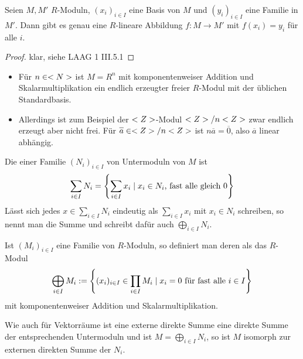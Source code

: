 \begin{proposition}
	Seien $M,M'$ $R$-Moduln, $(x_i)_{i\in I}$ eine Basis von $M$ und $(y_i)_{i\in I}$ eine Familie in $M'$. Dann gibt es genau eine $R$-lineare Abbildung $f:M\to M'$ mit $f(x_i)=y_i$ für alle $i$.
\end{proposition}
\begin{proof}
	klar, siehe LAAG 1 III.5.1 %
\end{proof}

\begin{example}
	\begin{itemize}
		\item Für $n\in<N>$ ist $M=R^n$ mit komponentenweiser Addition und Skalarmultiplikation ein endlich erzeugter freier $R$-Modul mit der üblichen Standardbasis.
		\item Allerdings ist zum Beispiel der $<Z>$-Modul $<Z>/n<Z>$ zwar endlich erzeugt aber nicht frei. Für $\overline{a}\in\whole/n\whole$ ist $n\overline{a}=\overline{0}$, also $\overline{a}$ linear abhängig.
	\end{itemize}
\end{example}

\begin{definition}
	Die  einer Familie $(N_i)_{i\in I}$ von Untermoduln von $M$ ist
	\begin{align}
		\sum_{i\in I} N_i=\left\lbrace \sum_{i\in I} x_i\mid x_i\in N_i\text{, fast alle gleich 0}\right\rbrace \notag
	\end{align}
	Lässt sich jedes $x\in\sum_{i\in I} N_i$ eindeutig als $\sum_{i\in I} x_i$ mit $x_i\in N_i$ schreiben, so nennt man die Summe  und schreibt dafür auch $\bigoplus_{i\in I} N_i$.
	
	Ist $(M_i)_{i\in I}$ eine Familie von $R$-Moduln, so definiert man deren  als das $R$-Modul 
	\begin{align}
		\bigoplus_{i\in I} M_i := \left\lbrace (x_i)_{i\in I}\in \prod_{i\in I} M_i\mid x_i=0\text{ für fast alle } i\in I\right\rbrace \notag
	\end{align}
	mit komponentenweiser Addition und Skalarmultiplikation.
\end{definition}

\begin{remark}
	Wie auch für Vektorräume ist eine externe direkte Summe eine direkte Summe der entsprechenden Untermoduln und ist $M=\bigoplus_{i\in I} N_i$, so ist $M$ isomorph zur externen direkten Summe der $N_i$.
\end{remark}

